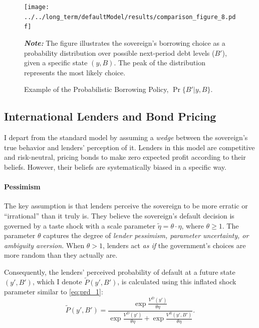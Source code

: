 \documentclass[12pt]{article}
\theoremstyle{plain}
\begin{document}
\begin{figure}[h!]
	\centering
	\texttt{[image: ../../long\_term/defaultModel/results/comparison\_figure\_8.pdf]}
	\caption{Example of the Probabilistic Borrowing Policy, $\Pr\{B'|y,B\}$.}
	\label{fig:borrowing_dist_example}
	\parbox{\textwidth}{\small\textit{\textbf{Note:} }The figure illustrates the sovereign's borrowing choice as a probability distribution over possible next-period debt levels ($B'$), given a specific state $(y, B)$. The peak of the distribution represents the most likely choice.}
\end{figure}

\subsection{International Lenders and Bond Pricing}

I depart from the standard model by assuming a \textit{wedge} between the
sovereign's true behavior and lenders' perception of it. Lenders in this model
are competitive and risk-neutral, pricing bonds to make zero expected profit
according to their beliefs. However, their beliefs are systematically biased in
a specific way.

\paragraph{Pessimism}The key assumption is that lenders perceive the sovereign to be more erratic or
``irrational'' than it truly is. They believe the sovereign's default decision
is governed by a taste shock with a scale parameter $\tilde{\eta} = \theta
	\cdot \eta$, where $\theta \ge 1$. The parameter $\theta$ captures the degree
of \textit{lender pessimism, parameter uncertainty, or ambiguity aversion.
}When $\theta > 1$, lenders act \textit{as if} the government's choices are
more random than they actually are.

Consequently, the lenders' perceived probability of default at a future state
$(y', B')$, which I denote $\tilde{P}(y', B')$, is calculated using this
inflated shock parameter similar to \eqref{eq:prd_1}:
\begin{equation}
	\tilde{P}(y', B') = \frac{\exp\frac{V^D(y')}{\theta\eta}}{\exp\frac{V^D(y')}{\theta\eta}+\exp\frac{V^R(y',B')}{\theta\eta}}.
	\label{eq:plender}
\end{equation}
\end{document}
